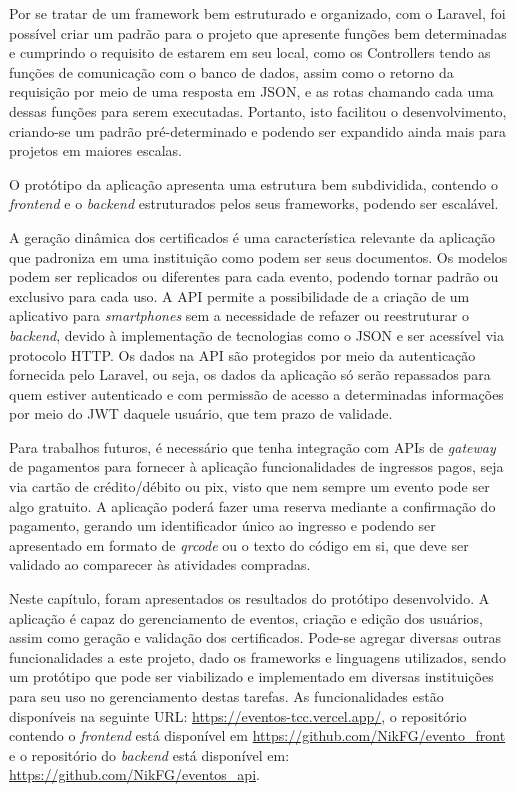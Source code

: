Por se tratar de um framework bem estruturado e organizado, com o Laravel, foi possível criar um padrão para o projeto que apresente funções bem determinadas e cumprindo o requisito de estarem em seu local, como os Controllers tendo as funções de comunicação com o banco de dados, assim como o retorno da requisição por meio de uma resposta em JSON, e as rotas chamando cada uma dessas funções para serem executadas. Portanto, isto facilitou o desenvolvimento, criando-se um padrão pré-determinado e podendo ser expandido ainda mais para projetos em maiores escalas.

O protótipo da aplicação apresenta uma estrutura bem subdividida, contendo o \textit{frontend} e o \textit{backend} estruturados pelos seus frameworks, podendo ser escalável.

A geração dinâmica dos certificados é uma característica relevante da aplicação que padroniza em uma instituição como podem ser seus documentos. Os modelos podem ser replicados ou diferentes para cada evento, podendo tornar padrão ou exclusivo para cada uso. A API permite a possibilidade de a criação de um aplicativo para \textit{smartphones} sem a necessidade de refazer ou reestruturar o \textit{backend}, devido à implementação de tecnologias como o JSON e ser acessível via protocolo HTTP. Os dados na API são protegidos por meio da autenticação fornecida pelo Laravel, ou seja, os dados da aplicação só serão repassados para quem estiver autenticado e com permissão de acesso a determinadas informações por meio do JWT daquele usuário, que tem prazo de validade. 

Para trabalhos futuros, é necessário que tenha integração com APIs de \textit{gateway} de pagamentos para fornecer à aplicação funcionalidades de ingressos pagos, seja via cartão de crédito/débito ou pix, visto que nem sempre um evento pode ser algo gratuito. A aplicação poderá fazer uma reserva mediante a confirmação do pagamento, gerando um identificador único ao ingresso e podendo ser apresentado em formato de \textit{qrcode} ou o texto do código em si, que deve ser validado ao comparecer às atividades compradas. 

Neste capítulo, foram apresentados os resultados do protótipo desenvolvido. A aplicação é capaz do gerenciamento de eventos, criação e edição dos usuários, assim como geração e validação dos certificados. Pode-se agregar diversas outras funcionalidades a este projeto, dado os frameworks e linguagens utilizados, sendo um protótipo que pode ser viabilizado e implementado em diversas instituições para seu uso no gerenciamento destas tarefas. As funcionalidades estão disponíveis na seguinte URL: \url{https://eventos-tcc.vercel.app/}, o repositório contendo o \textit{frontend} está disponível em \url{https://github.com/NikFG/evento_front} e o repositório do \textit{backend} está disponível em: \url{https://github.com/NikFG/eventos_api}.
